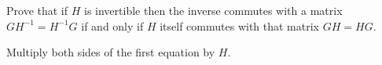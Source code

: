 
\begin{Exercise}[
name={},
title={}, 
difficulty=0,
origin={\cite{JH}}]
    Prove that if \( H \) is invertible then
    the inverse commutes with a matrix \( GH^{-1}=H^{-1}G \) 
    if and only if $H$ itself commutes with that matrix \( GH=HG \).
\end{Exercise}
\begin{Answer}
       Multiply both sides of the first equation by $H$.
\end{Answer}
